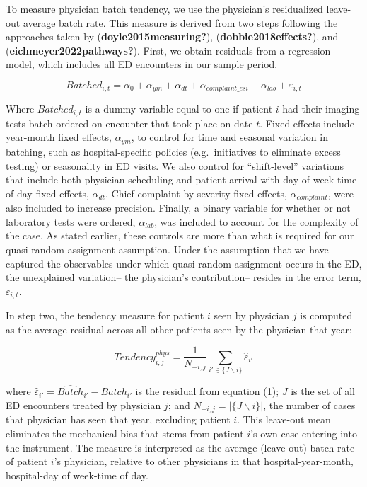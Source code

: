\documentclass{article}
\begin{document}
To measure physician batch tendency, we use the physician's residualized
leave-out average batch rate. This measure is derived from two steps
following the approaches taken by (\textbf{doyle2015measuring?}),
(\textbf{dobbie2018effects?}), and (\textbf{eichmeyer2022pathways?}).
First, we obtain residuals from a regression model, which includes all
ED encounters in our sample period.

\begin{equation}
Batched_{i,t} = \alpha_0 + \alpha_{ym} + \alpha_{dt} + \alpha_{complaint\_esi} + \alpha_{lab} + \varepsilon_{i,t}
\end{equation}

Where \(Batched_{i,t}\) is a dummy variable equal to one if patient
\(i\) had their imaging tests batch ordered on encounter that took place
on date \(t\). Fixed effects include year-month fixed effects,
\(\alpha_{ym}\), to control for time and seasonal variation in batching,
such as hospital-specific policies (e.g.~initiatives to eliminate excess
testing) or seasonality in ED visits. We also control for
``shift-level'' variations that include both physician scheduling and
patient arrival with day of week-time of day fixed effects,
\(\alpha_{dt}\). Chief complaint by severity fixed effects,
\(\alpha_{complaint}\), were also included to increase precision.
Finally, a binary variable for whether or not laboratory tests were
ordered, \(\alpha_{lab}\), was included to account for the complexity of
the case. As stated earlier, these controls are more than what is
required for our quasi-random assignment assumption. Under the
assumption that we have captured the observables under which
quasi-random assignment occurs in the ED, the unexplained variation--
the physician's contribution-- resides in the error term,
\(\varepsilon_{i,t}\).

In step two, the tendency measure for patient \(i\) seen by physician
\(j\) is computed as the average residual across all other patients seen
by the physician that year:

\begin{equation}
Tendency_{i,j}^{phys} =
\frac{1}{N_{-i,j}} \sum_{i' \in \{J \backslash i\}}\hat{\varepsilon}_{i'}
\end{equation}

where \(\hat{\varepsilon}_{i'} = \hat{Batch}_{i'} - Batch_{i'}\) is the
residual from equation (1); \(J\) is the set of all ED encounters
treated by physician \(j\); and \(N_{-i,j} = |\{J \backslash i\}|\), the
number of cases that physician has seen that year, excluding patient
\(i\). This leave-out mean eliminates the mechanical bias that stems
from patient \(i\)'s own case entering into the instrument. The measure
is interpreted as the average (leave-out) batch rate of patient \(i\)'s
physician, relative to other physicians in that hospital-year-month,
hospital-day of week-time of day.
\end{document}
